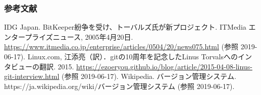 \documentclass[dvipdfmx]{beamer}
\begin{document}
\begin{frame}
    \frametitle{参考文献}
    \begin{thebibliography}{99}
         IDG Japan. BitKeeper紛争を受け、トーバルズ氏が新プロジェクト. ITMedia エンタープライズニュース, 2005年4月20日. \url{https://www.itmedia.co.jp/enterprise/articles/0504/20/news075.html} (参照 2019-06-17).
         Linux.com, 江添亮（訳）．gitの10周年を記念したLinus Torvalsへのインタビューの翻訳. 2015. \url{https://ezoeryou.github.io/blog/article/2015-04-08-linus-git-interview.html} (参照 2019-06-17).
         Wikipedia. バージョン管理システム. https://ja.wikipedia.org/wiki/バージョン管理システム (参照 2019-06-17).
    \end{thebibliography}    
\end{frame}
\end{document}
